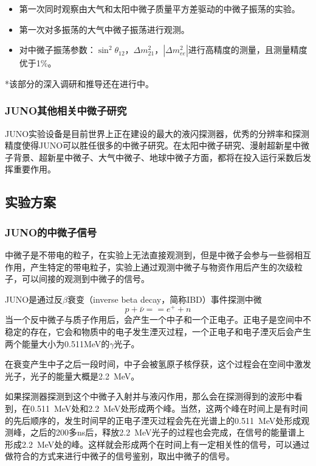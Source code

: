 \documentclass[10pt,a4paper]{article}
\begin{document}
\begin{itemize}
	\item{第一次同时观察由大气和太阳中微子质量平方差驱动的中微子振荡的实验。}
    \item{第一次对多振荡的大气中微子振荡进行观测。}
    \item{对中微子振荡参数：$\sin^2{\theta_{12}}$，$\Delta m^2_{21}$，$|\Delta m^2_{ee}|$进行高精度的测量，且测量精度优于1\%。}
\end{itemize}
*该部分的深入调研和推导还在进行中。

\subsubsection{JUNO其他相关中微子研究}

JUNO实验设备是目前世界上正在建设的最大的液闪探测器，优秀的分辨率和探测精度使得JUNO可以胜任很多的中微子研究。在太阳中微子研究、漫射超新星中微子背景、超新星中微子、大气中微子、地球中微子方面，都将在投入运行采数后发挥重要作用。

\subsection{实验方案}\label{sub:logicinter}

\subsubsection{JUNO的中微子信号}\label{sub:logicinter}

中微子是不带电的粒子，在实验上无法直接观测到，但是中微子会参与一些弱相互作用，产生特定的带电粒子，实验上通过观测中微子与物资作用后产生的次级粒子，可以间接的观测到中微子的信号。

JUNO是通过反$\beta$衰变（inverse beta decay，简称IBD）事件探测中微$$p+\bar{\nu}==e^{+}+n$$
当一个反中微子与质子作用后，会产生一个中子和一个正电子。正电子是空间中不稳定的存在，它会和物质中的电子发生湮灭过程，一个正电子和电子湮灭后会产生两个能量大小为0.511MeV的$\gamma$光子。

在衰变产生中子之后一段时间，中子会被氢原子核俘获，这个过程会在空间中激发光子，光子的能量大概是\SI{2.2}{MeV}。

如果探测器探测到这个中微子入射并与液闪作用，那么会在探测得到的波形中看到，在\SI{0.511}{MeV}处和\SI{2.2}{MeV}处形成两个峰。当然，这两个峰在时间上是有时间的先后顺序的，发生时间早的正电子湮灭过程会先在光谱上的\SI{0.511}{MeV}处形成观测峰，之后的200多ns后，释放\SI{2.2}{MeV}光子的过程也会完成，在信号的能量谱上形成\SI{2.2}{MeV}处的峰。这样就会形成两个在时间上有一定相关性的信号，可以通过做符合的方式来进行中微子的信号鉴别，取出中微子的信号。
\end{document}
